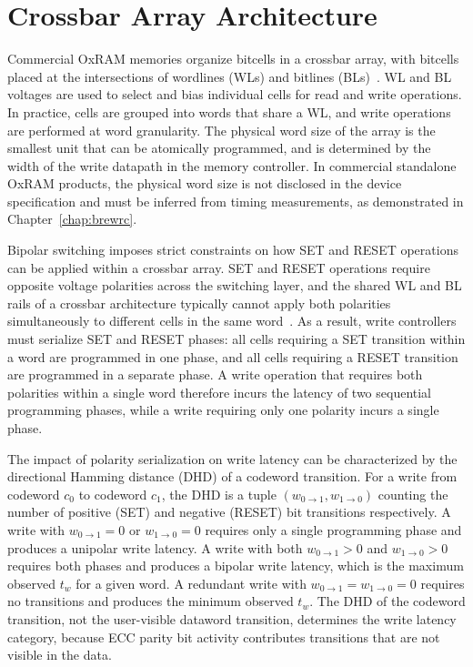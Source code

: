 \section{Crossbar Array Architecture}
\label{sec:bg-crossbar}

Commercial OxRAM memories organize bitcells in a crossbar array, with
bitcells placed at the intersections of wordlines (WLs) and bitlines
(BLs)~\cite{wong2012metal}. WL and BL voltages are used to select and
bias individual cells for read and write operations. In practice, cells
are grouped into words that share a WL, and write operations are
performed at word granularity. The physical word size of the array is
the smallest unit that can be atomically programmed, and is determined
by the width of the write datapath in the memory controller. In
commercial standalone OxRAM products, the physical word size is not
disclosed in the device specification and must be inferred from timing
measurements, as demonstrated in Chapter~\ref{chap:brewrc}.



Bipolar switching imposes strict constraints on how SET and RESET
operations can be applied within a crossbar array. SET and RESET
operations require opposite voltage polarities across the switching
layer, and the shared WL and BL rails of a crossbar architecture
typically cannot apply both polarities simultaneously to different cells
in the same word~\cite{xu2015overcoming}. As a result, write controllers
must serialize SET and RESET phases: all cells requiring a SET
transition within a word are programmed in one phase, and all cells
requiring a RESET transition are programmed in a separate phase. A write
operation that requires both polarities within a single word therefore
incurs the latency of two sequential programming phases, while a write
requiring only one polarity incurs a single phase.

The impact of polarity serialization on write latency can be
characterized by the directional Hamming distance (DHD) of a codeword
transition. For a write from codeword $c_0$ to codeword $c_1$, the DHD
is a tuple $(w_{0\to1}, w_{1\to0})$ counting the number of positive
(SET) and negative (RESET) bit transitions respectively. A write with
$w_{0\to1} = 0$ or $w_{1\to0} = 0$ requires only a single programming
phase and produces a unipolar write latency. A write with both
$w_{0\to1} > 0$ and $w_{1\to0} > 0$ requires both phases and produces a
bipolar write latency, which is the maximum observed $t_w$ for a given
word. A redundant write with $w_{0\to1} = w_{1\to0} = 0$ requires no
transitions and produces the minimum observed $t_w$. The DHD of the
codeword transition, not the user-visible dataword transition,
determines the write latency category, because ECC parity bit activity
contributes transitions that are not visible in the data.

